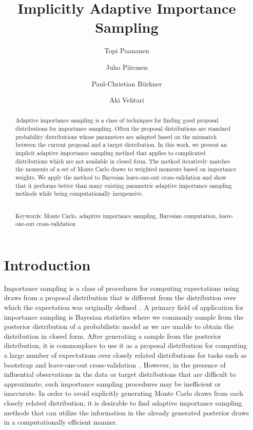 \documentclass[12pt]{article}
\title{\bf Implicitly Adaptive Importance Sampling}
\author{ Topi Paananen \and Juho Piironen \and Paul-Christian B\"urkner \and Aki Vehtari }
\begin{document}
\maketitle


\begin{abstract}
\noindent Adaptive importance sampling is a class of techniques for finding
good proposal distributions for importance sampling.
Often the proposal distributions are standard probability distributions whose
parameters are adapted based on the mismatch between the current proposal
and a target distribution.
In this work, we present an implicit adaptive importance sampling method that applies to
complicated distributions which are not available in closed form.
%
%
%
The method iteratively matches the moments of a set of Monte Carlo draws
%
to weighted moments based on importance weights.
%
%
%
%
We apply the method to Bayesian leave-one-out cross-validation
and show that it performs better than many existing parametric
adaptive importance sampling methods while being computationally inexpensive.


~\\
Keywords: Monte Carlo, adaptive importance sampling, Bayesian computation, leave-one-out cross-validation
\end{abstract}




\section{Introduction}



%
%
%
Importance sampling is a class of procedures
for computing expectations using draws from a proposal
distribution that is different from the distribution over which the 
expectation was originally defined~\citep{robert2013monte}. A primary field of application for
importance sampling is Bayesian statistics where we commonly sample
from the posterior distribution of a probabilistic model as we are unable 
to obtain the distribution in closed form.
%
%
%
%
%
%
%
%
%
%
After generating a sample from the posterior distribution, it is commonplace to use it
as a proposal distribution for computing a large number of expectations over closely related distributions
for tasks such as bootstrap and leave-one-out cross-validation~\citep{gelfand1992model,gelfand1996model,peruggia1997variability,epifani2008case,vehtari2017practical,giordano2019swiss}.
However, in the presence of influential observations in the data or target distributions
that are difficult to approximate,
such importance sampling procedures may be inefficient or inaccurate.
%
%
%
%
%
In order to avoid explicitly generating Monte Carlo draws from each
closely related distribution, it is desirable to find
adaptive importance sampling methods that can utilize the information
in the already generated posterior draws in a computationally efficient manner.
\end{document}
